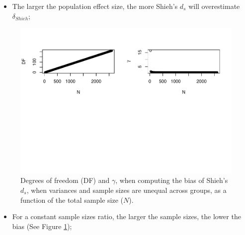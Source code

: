 \documentclass[
  english,
  man]{apa6}
\providecommand{\tightlist}{%
  \setlength{\itemsep}{0pt}\setlength{\parskip}{0pt}}
\begin{document}
\begin{itemize}
\tightlist
\item
  The larger the population effect size, the more Shieh's \(d_s\) will overestimate \(\delta_{Shieh}\);
\end{itemize}

\begin{figure}
\centering
\includegraphics{Theoretical-Bias-of-all-estimators-as-a-function-of-population-parameters_files/figure-latex/biasshiehhetunbalNsize2-1.pdf}
\caption{\label{fig:biasshiehhetunbalNsize2}Degrees of freedom (DF) and \(\gamma\), when computing the bias of Shieh's \(d_s\), when variances and sample sizes are unequal across groups, as a function of the total sample size (\(N\)).}
\end{figure}

\begin{itemize}
\tightlist
\item
  For a constant sample sizes ratio, the larger the sample sizes, the lower the bias (See Figure \ref{fig:biasshiehhetunbalNsize2});
\end{itemize}
\end{document}
